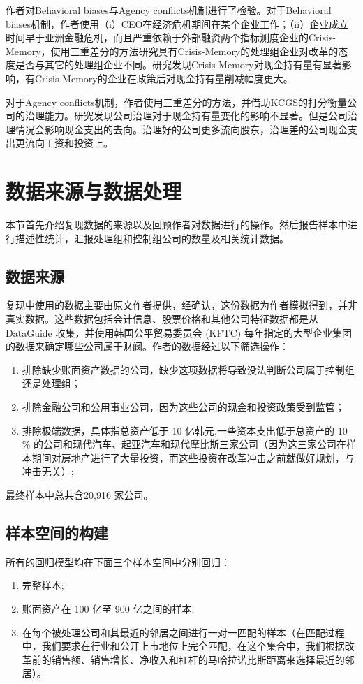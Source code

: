\documentclass{article}
\begin{document}
\indent 作者对Behavioral biases与Agency conflicts机制进行了检验。对于Behavioral biases机制，作者使用（i）CEO在经济危机期间在某个企业工作；（ii）企业成立时间早于亚洲金融危机，而且严重依赖于外部融资两个指标测度企业的Crisis-Memory，使用三重差分的方法研究具有Crisis-Memory的处理组企业对改革的态度是否与其它的处理组企业不同。研究发现Crisis-Memory对现金持有量有显著影响，有Crisis-Memory的企业在政策后对现金持有量削减幅度更大。

\indent 对于Agency conflicts机制，作者使用三重差分的方法，并借助KCGS的打分衡量公司的治理能力。研究发现公司治理对于现金持有量变化的影响不显著。但是公司治理情况会影响现金支出的去向。治理好的公司更多流向股东，治理差的公司现金支出更流向工资和投资上。

\section{数据来源与数据处理}
\indent 本节首先介绍复现数据的来源以及回顾作者对数据进行的操作。然后报告样本中进行描述性统计，汇报处理组和控制组公司的数量及相关统计数据。

\subsection{数据来源}
\indent 复现中使用的数据主要由原文作者提供，经确认，这份数据为作者模拟得到，并非真实数据。这些数据包括会计信息、股票价格和其他公司特征数据都是从 DataGuide 收集，并使用韩国公平贸易委员会 (KFTC) 每年指定的大型企业集团的数据来确定哪些公司属于财阀。作者的数据经过以下筛选操作：

\begin{enumerate}
    \item 排除缺少账面资产数据的公司，缺少这项数据将导致没法判断公司属于控制组还是处理组；
    \item 排除金融公司和公用事业公司，因为这些公司的现金和投资政策受到监管；
    \item 排除极端数据，具体指总资产低于 10 亿韩元,一些资本支出低于总资产的 10 \% 的公司和现代汽车、起亚汽车和现代摩比斯三家公司（因为这三家公司在样本期间对房地产进行了大量投资，而这些投资在改革冲击之前就做好规划，与冲击无关）;
\end{enumerate}

\indent 最终样本中总共含20,916 家公司。

\subsection{样本空间的构建}
\indent 所有的回归模型均在下面三个样本空间中分别回归：
\begin{enumerate}
    \item 完整样本;
    \item 账面资产在 100 亿至 900 亿之间的样本;
    \item 在每个被处理公司和其最近的邻居之间进行一对一匹配的样本（在匹配过程中，我们要求在行业和公开上市地位上完全匹配，在这个集合中，我们根据改革前的销售额、销售增长、净收入和杠杆的马哈拉诺比斯距离来选择最近的邻居）。
\end{enumerate}
\end{document}

